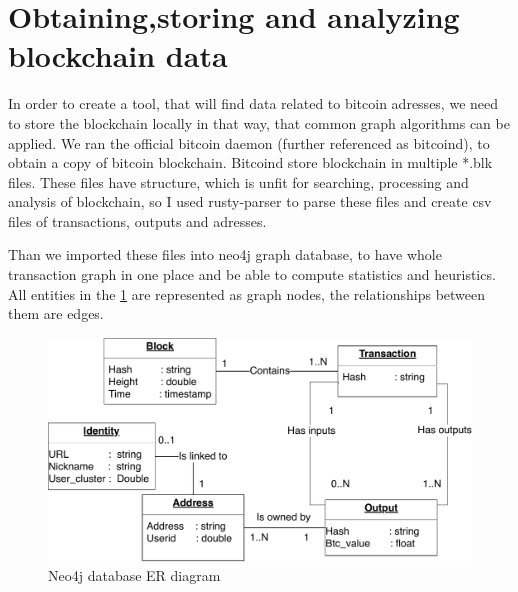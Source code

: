 \documentclass[
  digital, %
  table,   %
  lof,     %
  lot,     %
  oneside
]{fithesis3}
\begin{document}
\section{Obtaining,storing and analyzing blockchain data}
In order to create a tool, that will find data related to bitcoin adresses, we need to store the blockchain locally in that way, that common graph algorithms can be applied.
We ran the official bitcoin daemon (further referenced as bitcoind), to obtain a copy of bitcoin blockchain. Bitcoind store blockchain in multiple *.blk files.
These files have structure, which is unfit for searching, processing and analysis of blockchain, so I used rusty-parser to parse these files and create csv files of transactions, outputs and adresses.

Than we imported these files into neo4j graph database, to have whole transaction graph in one place and be able to compute statistics and heuristics.
All entities in the \ref{neo4jschema} are represented as graph nodes, the relationships between them are edges.
\begin{figure}[!htb]
    \centering
    \includegraphics[width=1\textwidth]{neo4j-schema}
    \caption{Neo4j database ER diagram}
    \label{neo4jschema}
\end{figure}
\end{document}
